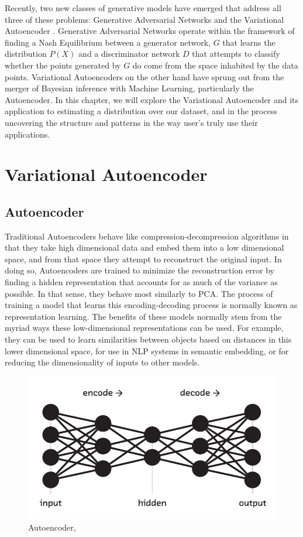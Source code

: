 Recently, two new classes of generative models have emerged that address all three of these problems: Generative Adversarial Networks \citep{goodfellow2014generative} and the Variational Autoencoder \citep{kingma2013auto}. Generative Adversarial Networks operate within the framework of finding a Nash Equilibrium between a generator network, $G$ that learns the distribution $P(X)$ and a discriminator network $D$ that attempts to classify whether the points generated by $G$ do come from the space inhabited by the data points. Variational Autoencoders on the other hand have sprung out from the merger of Bayesian inference with Machine Learning, particularly the Autoencoder. In this chapter, we will explore the Variational Autoencoder and its application to estimating a distribution over our dataset, and in the process uncovering the structure and patterns in the way user's truly use their applications.


\section{Variational Autoencoder}
\subsection{Autoencoder}
Traditional Autoencoders behave like compression-decompression algorithms in that they take high dimensional data and embed them into a low dimensional space, and from that space they attempt to reconstruct the original input. In doing so, Autoencoders are trained to minimize the reconstruction error by finding a hidden representation that accounts for as much of the variance as possible. In that sense, they behave most similarly to PCA. The process of training a model that learns this encoding-decoding process is normally known as representation learning. The benefits of these models normally stem from the myriad ways these low-dimensional representations can be used. For example, they can be used to learn similarities between objects based on distances in this lower dimensional space, for use in NLP systems in semantic embedding, or for reducing the dimensionality of inputs to other models.

 \begin{figure}[htbp]
     \centering
     \includegraphics[width=1\textwidth]{images/miriams-figure.png}
     \caption{Autoencoder, \citep{_lorenz_}}
     \label{fig:ae}
 \end{figure}
 
